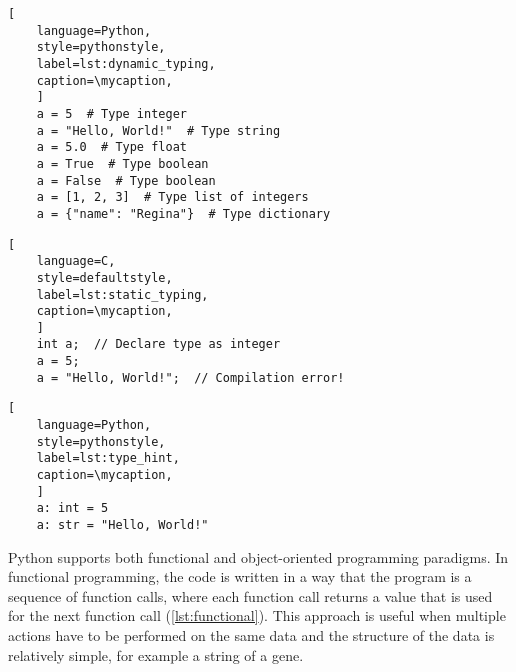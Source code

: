 \def\mycaption{ Example of dynamic typing in python. The variable ``\texttt{a}''
    is assigned the value 5, which is an integer. The variable ``\texttt{a}'' is then
    assigned the value ``\texttt{Hello, World!}'', which is a string. Note that code
    after ``\texttt{\#}'' is considered a comment and not executed.}
\begin{lstlisting}[
    language=Python,
    style=pythonstyle,
    label=lst:dynamic_typing,
    caption=\mycaption,
    ]
    a = 5  # Type integer
    a = "Hello, World!"  # Type string
    a = 5.0  # Type float
    a = True  # Type boolean
    a = False  # Type boolean
    a = [1, 2, 3]  # Type list of integers
    a = {"name": "Regina"}  # Type dictionary
\end{lstlisting}
\def\mycaption{ Example of static typing in C. The variable ``a'' is
    declared as an integer, and can only store integers. The variable ``a''
    is then assigned the value 5, which is an integer. The variable ``a'' is
    then assigned the value ``Hello, World!'', which is a string. This
    results in a compilation error, because the variable ``a'' can only
    store integers.}
\begin{lstlisting}[
    language=C,
    style=defaultstyle,
    label=lst:static_typing,
    caption=\mycaption,
    ]
    int a;  // Declare type as integer
    a = 5;
    a = "Hello, World!";  // Compilation error!
\end{lstlisting}
\def\mycaption{ Example of type hints used in python. Explicitly stating
    the type of the variable is optional and does not change the behavior of
    the code.}
\begin{lstlisting}[
    language=Python,
    style=pythonstyle,
    label=lst:type_hint,
    caption=\mycaption,
    ]
    a: int = 5
    a: str = "Hello, World!"
\end{lstlisting}


Python supports both functional and object-oriented programming
paradigms. In functional programming, the code is written in a way that
the program is a sequence of function calls, where each function call
returns a value that is used for the next function call
(\autoref{lst:functional}). This approach is useful when multiple
actions have to be performed on the same data and the structure of the
data is relatively simple, for example a string of a gene.

